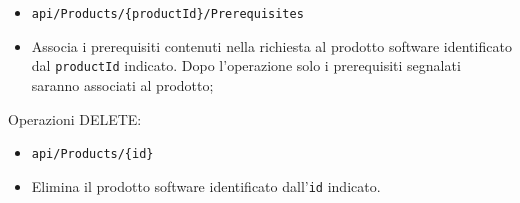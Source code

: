 \documentclass[../RelazioneFinale.tex]{subfiles}
\begin{document}
\begin{description}
\begin{itemize}
					\item \verb|api/Products/{productId}/Prerequisites|
					\item[] Associa i prerequisiti contenuti nella richiesta al prodotto software identificato dal \verb|productId| indicato. Dopo l'operazione solo i prerequisiti segnalati saranno associati al prodotto;
					
				\end{itemize}

				\item Operazioni DELETE:
				\begin{itemize}
					\item \verb|api/Products/{id}| 
					\item[] Elimina il prodotto software identificato dall'\verb|id| indicato.
				\end{itemize}
				
			\end{description}						
			
\end{document}
